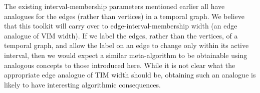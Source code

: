 \documentclass[a4paper,UKenglish,cleveref, autoref, thm-restate]{lipics-v2021} %
\begin{document}
The existing interval-membership parameters mentioned earlier all have analogues for the edges (rather than vertices) in a temporal graph. We believe that this toolkit will carry over to edge-interval-membership width (an edge analogue of VIM width). If we label the edges, rather than the vertices, of a temporal graph, and allow the label on an edge to change only within its active interval, then we would expect a similar meta-algorithm to be obtainable using analogous concepts to those introduced here. While it is not clear what the appropriate edge analogue of TIM width should be, obtaining such an analogue is likely to have interesting algorithmic consequences.  %
\end{document}
